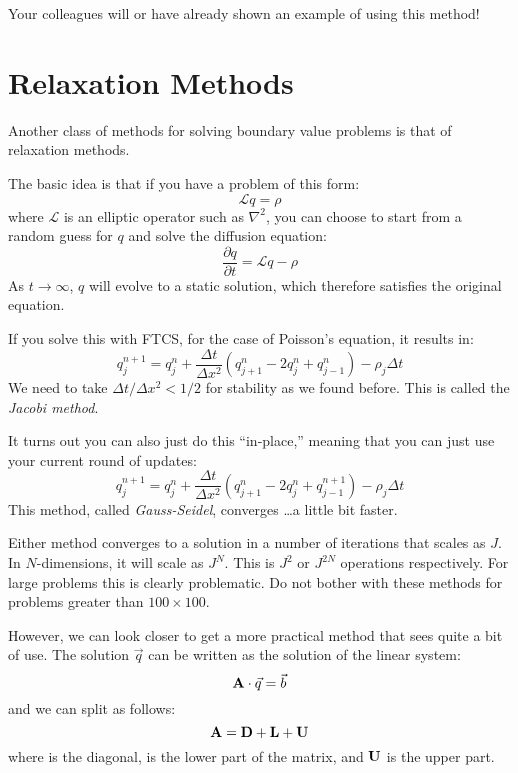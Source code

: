 Your colleagues will or have already shown an example of using this
method! 

\section{Relaxation Methods}

Another class of methods for solving boundary value problems is that
of relaxation methods.

The basic idea is that if you have a problem of this form:
\begin{equation}
\mathcal{L} q = \rho
\end{equation}
where $\mathcal{L}$ is an elliptic operator such as $\nabla^2$, you
can choose to start from a random guess for $q$ and solve the
diffusion equation:
\begin{equation}
\frac{\partial q}{\partial t} = \mathcal{L} q - \rho
\end{equation}
As $t\rightarrow\infty$, $q$ will evolve to a static solution, which
therefore satisfies the original equation. 

If you solve this with FTCS, for the case of Poisson's equation, it
results in:
\begin{equation}
q_j^{n+1} = q_j^n + \frac{\Delta t}{\Delta x^2} \left(q_{j+1}^n - 2
q_j^n +q_{j-1}^{n}\right) - \rho_j \Delta t
\end{equation}
We need to take $\Delta t / \Delta x^2 < 1/2$ for stability as we
found before. This is called the {\it Jacobi method}. 

It turns out you can also just do this ``in-place,'' meaning that you
can just use your current round of updates:
\begin{equation}
q_j^{n+1} = q_j^n + \frac{\Delta t}{\Delta x^2} \left(q_{j+1}^n - 2
q_j^n +q_{j-1}^{n+1}\right) - \rho_j \Delta t
\end{equation}
This method, called {\it Gauss-Seidel}, converges \ldots a little bit
faster.

Either method converges to a solution in a number of iterations that
scales as $J$. In $N$-dimensions, it will scale as $J^N$. This is
$J^2$ or $J^{2N}$ operations respectively. For large problems this is
clearly problematic. Do not bother with these methods for problems
greater than $100\times 100$. 

However, we can look closer to get a more practical method that sees
quite a bit of use. The solution $\vec{q}$ can be written as the
solution of the linear system:
\begin{equation}
{\bf A}\cdot\vec{q} = \vec{b}
\end{equation}
and we can split  as follows:
\begin{equation}
{\bf A} = {\bf D} + {\bf L} + {\bf U}
\end{equation}
where  is the diagonal,  is the lower part of the
matrix, and ${\bf U}$ is the upper part.


